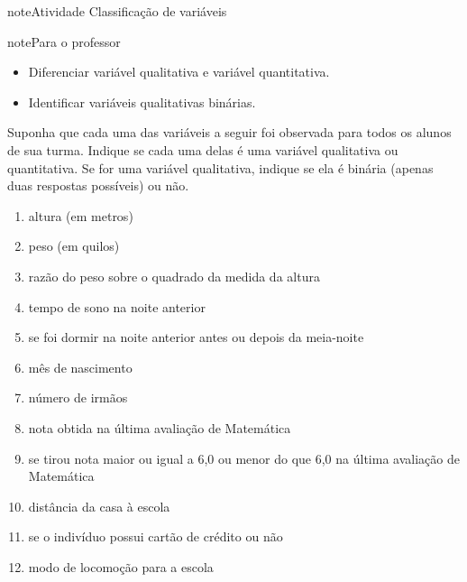 \label{\detokenize{PE103-2:ativ-classificacao-de-variaveis}}
\begin{sphinxadmonition}{note}{Atividade}{ Classificação de variáveis}

\begin{sphinxadmonition}{note}{Para o professor}

\begin{itemize}
\item {} 
Diferenciar variável qualitativa e variável quantitativa.

\item {} 
Identificar variáveis qualitativas binárias.

\end{itemize}
\end{sphinxadmonition}

Suponha que cada uma das variáveis a seguir foi observada para todos os alunos de sua turma. Indique se cada uma delas é uma variável qualitativa ou quantitativa. Se for uma variável qualitativa, indique se ela é binária (apenas duas respostas possíveis) ou não.
\begin{enumerate}
\item {} 
altura (em metros)

\item {} 
peso (em quilos)

\item {} 
razão do peso sobre o quadrado da medida da altura

\item {} 
tempo de sono na noite anterior

\item {} 
se foi dormir na noite anterior antes ou depois da meia-noite

\item {} 
mês de nascimento

\item {} 
número de irmãos

\item {} 
nota obtida na última avaliação de Matemática

\item {} 
se tirou nota maior ou igual a 6,0 ou menor do que 6,0 na última avaliação de Matemática

\item {} 
distância da casa à escola

\item {} 
se o indivíduo possui cartão de crédito ou não

\item {} 
modo de locomoção para a escola

\end{enumerate}
\end{sphinxadmonition}

